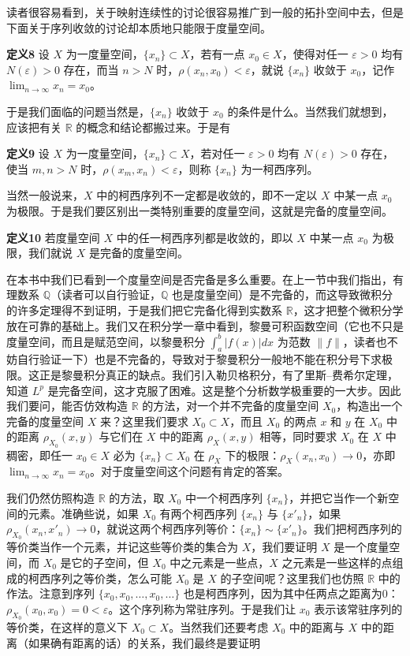 读者很容易看到，关于映射连续性的讨论很容易推广到一般的拓扑空间中去，但是下面关于序列收敛的讨论却本质地只能限于度量空间。

\noindent\textbf{定义8}\quad
设 $X$ 为一度量空间，$\{x_n\}\subset X$，若有一点 $x_0\in X$，使得对任一 $\varepsilon>0$ 均有 $N(\varepsilon)>0$ 存在，而当 $n>N$ 时，$\rho(x_n,x_0)<\varepsilon$，就说 $\{x_n\}$ 收敛于 $x_0$，记作 $\lim_{n\to\infty}x_n=x_0$。

于是我们面临的问题当然是，$\{x_n\}$ 收敛于 $x_0$ 的条件是什么。当然我们就想到，应该把有关 $\mathbb R$ 的概念和结论都搬过来。于是有

\noindent\textbf{定义9}\quad
设 $X$ 为一度量空间，$\{x_n\}\subset X$，若对任一 $\varepsilon>0$ 均有 $N(\varepsilon)>0$ 存在，使当 $m,n>N$ 时，$\rho(x_m,x_n)<\varepsilon$，则称 $\{x_n\}$ 为一柯西序列。

当然一般说来，$X$ 中的柯西序列不一定都是收敛的，即不一定以 $X$ 中某一点 $x_0$ 为极限。于是我们要区别出一类特别重要的度量空间，这就是完备的度量空间。

\noindent\textbf{定义10}\quad
若度量空间 $X$ 中的任一柯西序列都是收敛的，即以 $X$ 中某一点 $x_0$ 为极限，我们就说 $X$ 是完备的度量空间。

在本书中我们已看到一个度量空间是否完备是多么重要。在上一节中我们指出，有理数系 $\mathbb Q$（读者可以自行验证，$\mathbb Q$ 也是度量空间）是不完备的，而这导致微积分的许多定理得不到证明，于是我们把它完备化得到实数系 $\mathbb R$，这才把整个微积分学放在可靠的基础上。我们又在积分学一章中看到，黎曼可积函数空间（它也不只是度量空间，而且是赋范空间，以黎曼积分 $\int_a^b|f(x)|dx$ 为范数 $\|f\|$，读者也不妨自行验证一下）也是不完备的，导致对于黎曼积分一般地不能在积分号下求极限。这正是黎曼积分真正的缺点。我们引入勒贝格积分，有了里斯--费希尔定理，知道 $L^p$ 是完备空间，这才克服了困难。这是整个分析数学极重要的一大步。因此我们要问，能否仿效构造 $\mathbb R$ 的方法，对一个并不完备的度量空间 $X_0$，构造出一个完备的度量空间 $X$ 来？这里我们要求 $X_0\subset X$，而且 $X_0$ 的两点 $x$ 和 $y$ 在 $X_0$ 中的距离 $\rho_{X_0}(x,y)$ 与它们在 $X$ 中的距离 $\rho_X(x,y)$ 相等，同时要求 $X_0$ 在 $X$ 中稠密，即任一 $x_0\in X$ 必为 $\{x_n\}\subset X_0$ 在 $\rho_X$ 下的极限：$\rho_X(x_n,x_0)\to0$，亦即 $\lim_{n\to\infty}x_n=x_0$。对于度量空间这个问题有肯定的答案。

我们仍然仿照构造 $\mathbb R$ 的方法，取 $X_0$ 中一个柯西序列 $\{x_n\}$，并把它当作一个新空间的元素。准确些说，如果 $X_0$ 有两个柯西序列 $\{x_n\}$ 与 $\{x'_n\}$，如果 $\rho_{X_0}(x_n,x'_n)\to0$，就说这两个柯西序列等价：$\{x_n\}\sim\{x'_n\}$。我们把柯西序列的等价类当作一个元素，并记这些等价类的集合为 $X$，我们要证明 $X$ 是一个度量空间，而 $X_0$ 是它的子空间，但 $X_0$ 中之元素是一些点，$X$ 之元素是一些这样的点组成的柯西序列之等价类，怎么可能 $X_0$ 是 $X$ 的子空间呢？这里我们也仿照 $\mathbb R$ 中的作法。注意到序列 $\{x_0,x_0,\ldots,x_0,\ldots\}$ 也是柯西序列，因为其中任两点之距离为0：$\rho_{X_0}(x_0,x_0)=0<\varepsilon$。这个序列称为常驻序列。于是我们让 $x_0$ 表示该常驻序列的等价类，在这样的意义下 $X_0\subset X$。当然我们还要考虑 $X_0$ 中的距离与 $X$ 中的距离（如果确有距离的话）的关系，我们最终是要证明

